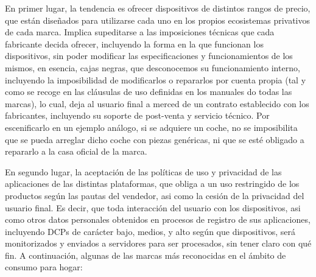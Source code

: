 En primer lugar, la tendencia es ofrecer dispositivos de distintos rangos de precio, que están diseñados para utilizarse cada uno en los propios ecosistemas privativos de cada marca. Implica supeditarse a las imposiciones técnicas que cada fabricante decida ofrecer, incluyendo la forma en la que funcionan los dispositivos, sin poder modificar las especificaciones y funcionamientos de los mismos, en esencia, cajas negras, que desconocemos su funcionamiento interno, incluyendo la imposibilidad de modificarlos o repararlos por cuenta propia (tal y como se recoge en las cláusulas de uso definidas en los manuales do todas las marcas), lo cual, deja al usuario final a merced de un contrato establecido con los fabricantes, incluyendo su soporte de post-venta y servicio técnico. Por escenificarlo en un ejemplo análogo, si se adquiere un coche, no se imposibilita que se pueda arreglar dicho coche con piezas genéricas, ni que se esté obligado a repararlo a la casa oficial de la marca.

En segundo lugar, la aceptación de las políticas de uso y privacidad de las aplicaciones de las distintas plataformas, que obliga a un uso restringido de los productos según las pautas del vendedor, asi como la cesión de la privacidad del usuario final. Es decir, que toda interacción del usuario con los dispositivos, asi como otros datos personales obtenidos en procesos de registro de sus aplicaciones, incluyendo DCPs de carácter bajo, medios, y alto según que dispositivos, será monitorizados y enviados a servidores para ser procesados, sin tener claro con qué fin. A continuación, algunas de las marcas más reconocidas en el ámbito de consumo para hogar:

